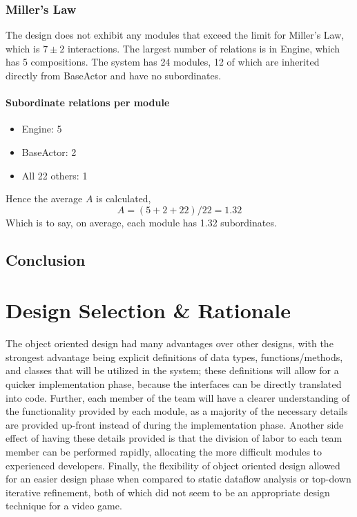 \documentclass{article}
\begin{document}
		\subsubsection{Miller's Law}
			The design does not exhibit any modules that exceed the limit for Miller's Law, which is $7\pm2$ interactions. The largest number of relations is in Engine, which has 5 compositions. The system has 24 modules, 12 of which are inherited directly from BaseActor and have no subordinates.
			
			\paragraph{Subordinate relations per module}			
			\begin{itemize}
				\item Engine: 5
				\item BaseActor: 2
				\item All 22 others: 1
			\end{itemize}
			
			Hence the average $A$ is calculated,
			$$A = (5 + 2 + 22)/22 = 1.32$$
			Which is to say, on average, each module has 1.32 subordinates.
	\subsection{Conclusion}
%
%
\section{Design Selection \& Rationale}
The object oriented design had many advantages over other designs, with the strongest advantage being explicit definitions of data types, functions/methods, and classes that will be utilized in the system; these definitions will allow for a quicker implementation phase, because the interfaces can be directly translated into code. Further, each member of the team will have a clearer understanding of the functionality provided by each module, as a majority of the necessary details are provided up-front instead of during the implementation phase. Another side effect of having these details provided is that the division of labor to each team member can be performed rapidly, allocating the more difficult modules to experienced developers. Finally, the flexibility of object oriented design allowed for an easier design phase when compared to static dataflow analysis or top-down iterative refinement, both of which did not seem to be an appropriate design technique for a video game.
\end{document}
